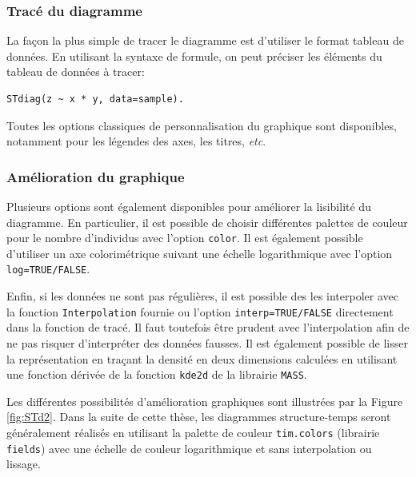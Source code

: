 \subsubsection{Tracé du diagramme}

La façon la plus simple de tracer le diagramme est d'utiliser le format tableau
de données. En utilisant la syntaxe de formule, on peut préciser les éléments du
tableau de données à tracer:
\begin{verbatim}
STdiag(z ~ x * y, data=sample).
\end{verbatim}
Toutes les options classiques de personnalisation du graphique sont disponibles,
notamment pour les légendes des axes, les titres, \textit{etc}.

\subsubsection{Amélioration du graphique}

Plusieurs options sont également disponibles pour améliorer la lisibilité du
diagramme. En particulier, il est possible de choisir différentes palettes de
couleur pour le nombre d'individus avec l'option \texttt{color}. Il est
également possible d'utiliser un axe colorimétrique suivant une échelle
logarithmique avec l'option \texttt{log=TRUE/FALSE}. 

Enfin, si les données ne sont pas régulières, il est possible des les interpoler
avec la fonction \texttt{Interpolation} fournie ou l'option
\texttt{interp=TRUE/FALSE} directement dans la fonction de tracé. Il faut
toutefois être prudent avec l'interpolation afin de ne pas risquer d'interpréter
des données fausses. Il est également possible de lisser la représentation en
traçant la densité en deux dimensions calculées en utilisant une fonction
dérivée de la fonction \texttt{kde2d} de la librairie \texttt{MASS}. 

Les différentes possibilités d'amélioration graphiques sont illustrées par la
Figure \ref{fig:STd2}. Dans la suite de cette thèse, les diagrammes
structure-temps seront généralement réalisés en utilisant la palette de couleur
\texttt{tim.colors} (librairie \texttt{fields}) avec une échelle de couleur
logarithmique et sans interpolation ou lissage. 

